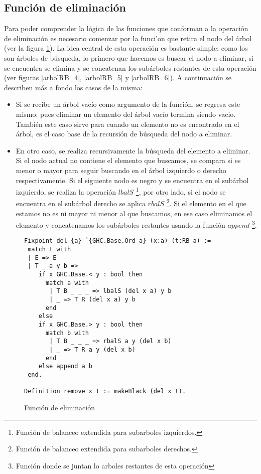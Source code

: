 \subsection{Funci\'on de eliminaci\'on}

Para poder comprender la l\'ogica de las funciones que conforman a la operaci\'on de eliminaci\'on
es necesario comenzar por la funci'on que retira el nodo del \'arbol (ver la figura \ref{func_del}).
La idea central de esta operaci\'on es bastante simple: como los {\arns} son \'arboles de búsqueda,
lo primero que hacemos es buscar el nodo a eliminar, si se encuentra se elimina y se concatenan los
subárboles restantes de esta operaci\'on (ver figuras \ref{arbolRB_4}, \ref{arbolRB_5} y
\ref{arbolRB_6}). A continuaci\'on se describen m\'as a fondo los casos de la misma:

\begin{itemize}
    \item Si se recibe un \'arbol vacío como argumento de la funci\'on, se regresa este mismo; pues
    eliminar un elemento del \'arbol vacío termina siendo vacio. También este caso sirve para
    cuando un elemento no es encontrado en el \'arbol, es el caso base de la recursi\'on de
    búsqueda del nodo a eliminar.
    \item En otro caso, se realiza recursivamente la búsqueda del elemento a eliminar. Si el nodo
    actual no contiene el elemento que buscamos, se compara si es menor o mayor para seguir
    buscando en el \'arbol izquierdo o derecho respectivamente. Si el siguiente nodo es negro y se
    encuentra en el sub\'arbol izquierdo, se realiza la operaci\'on $lbalS$ \footnote{Funci\'on de
    balanceo extendida para subarboles izquierdos.}, por otro lado, si el nodo se encuentra en el
    sub\'arbol derecho se aplica $rbalS$ \footnote{Funci\'on de balanceo extendida para subarboles
    derechos.}. Si el elemento en el que estamos no es ni mayor ni menor al que buscamos, en ese
    caso eliminamos el elemento y concatenamos los subárboles restantes usando la función $append$
    \footnote{Funci\'on donde se juntan lo arboles restantes de esta operaci\'on}.
\end{itemize}

\begin{figure}
\centering
\captionsetup{justification=centering}
\begin{verbatim}
Fixpoint del {a} `{GHC.Base.Ord a} (x:a) (t:RB a) :=
 match t with
 | E => E
 | T _ a y b =>
    if x GHC.Base.< y : bool then
      match a with
       | T B _ _ _ => lbalS (del x a) y b
       | _ => T R (del x a) y b
      end
    else
    if x GHC.Base.> y : bool then
      match b with
       | T B _ _ _ => rbalS a y (del x b)
       | _ => T R a y (del x b)
      end
    else append a b
 end.

Definition remove x t := makeBlack (del x t).
\end{verbatim}
\caption{Función de eliminación}
\label{func_del}
\end{figure}

